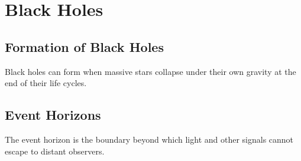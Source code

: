 \section{Black Holes}
\subsection{Formation of Black Holes}
Black holes can form when massive stars collapse under their own gravity at the end of their life cycles.
\subsection{Event Horizons}
The event horizon is the boundary beyond which light and other signals cannot escape to distant observers.